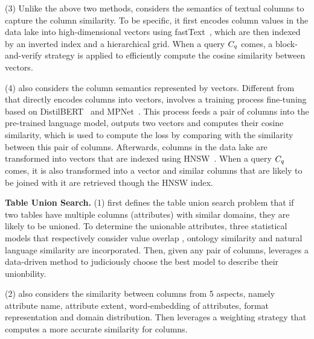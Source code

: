 
 

 \noindent  (3) Unlike the above two methods, \pex considers the semantics of textual columns to capture the column similarity. To be specific, it first encodes column values in the data lake into high-dimensional vectors using fastText~\cite{}, which are then indexed by an inverted index and a hierarchical grid. When a query $C_q$ comes, a block-and-verify strategy is applied to efficiently compute the cosine similarity between vectors. 
 
 
 
 \noindent  (4) \deepjoin also considers the column semantics represented by vectors. Different from \pex that directly encodes columns into vectors,  \deepjoin involves a training process fine-tuning based on DistilBERT~\cite{} and MPNet~\cite{}. This process feeds a pair of columns into the pre-trained language model,  outputs two vectors and computes their cosine similarity, which is used to compute the loss by comparing with the similarity between this pair of columns. Afterwards,  columns in the data lake are transformed into vectors that are indexed using HNSW~\cite{}. When a query $C_q$ comes, it is also transformed into a vector and similar columns that are likely to be joined with it are retrieved though the HNSW index. 
 

 



\noindent\textbf{Table Union Search.}
 (1) \tus first defines the table union search problem that  if two tables have multiple columns (\ie attributes) with similar domains, they are likely to be unioned. To determine the unionable attributes, three statistical models that respectively consider value overlap , ontology similarity and natural language similarity are incorporated. Then, given any pair of columns,  \tus leverages a data-driven  method to judiciously choose the best model to describe their unionbility. %

 \noindent  (2) \dlll also considers the similarity between columns from 5 aspects, namely attribute name, attribute extent, word-embedding of attributes, format representation and domain distribution. Then \dlll leverages a weighting strategy that computes a more accurate similarity for columns.  
  
